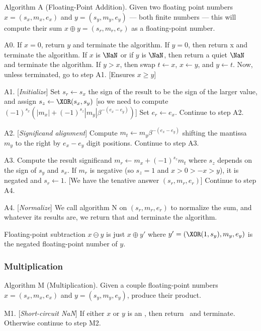 \algbegin Algorithm A (Floating-Point Addition). Given two floating
point numbers $x=(s_{x},m_{x},e_{x})$ and $y=(s_{y},m_{y},e_{y})$ ---
both finite numbers --- this
will compute their sum $x\oplus y = (s_{r}, m_{r}, e_{r})$ as a
floating-point number.

\algstep A0.
If $x = 0$, return $y$ and terminate the algorithm.
If $y=0$, then return x and terminate the algorithm.
If $x$ is $\NaN$ or if $y$ is $\NaN$, then return a quiet $\NaN$
and terminate the algorithm.
If $y > x$, then swap $t\gets x$, $x\gets y$, and $y\gets t$.
Now, unless terminated, go to step A1. [Ensures $x\geq y$]

\algstep A1. [{\it Initialize\/}]
Set $s_{r}\gets s_{x}$ the sign of the
result to be the sign of the larger value, and assign $s_{z} \gets \XOR(s_{x},s_{y})$
[so we need to compute $(-1)^{s_{x}}(|m_{x}| + (-1)^{s_{z}}|m_{y}|\beta^{-(e_{x}-e_{y})})$]
Set $e_{r}\gets e_{x}$. Continue to step A2.

\algstep A2. [{\it Significand alignment\/}] Compute $m_{t}\gets m_{y}\beta^{-(e_{x}-e_{y})}$
shifting the mantissa $m_{y}$ to the right by $e_{x}-e_{y}$ digit
positions. Continue to step A3.

\algstep A3. Compute the result significand $m_{r}\gets m_{x} + (-1)^{s_{z}}m_{t}$
where $s_{z}$ depends on the sign of $s_{y}$ and $s_{x}$. If $m_{r}$
is negative (so $s_{z}=1$ and $x>0>-x>y$), it is negated and $s_{r}\gets 1$.
[We have the tenative answer $(s_{r}, m_{r}, e_{r})$] Continue to step A4.

\algstep A4. [{\it Normalize\/}] We call algorithm N on $(s_{r}, m_{r}, e_{r})$
to normalize the sum, and whatever its results are, we return that and
terminate the algorithm.\quad\slug

\begin{rmk}[Subtraction]
  Floating-point subtraction $x\ominus y$ is just $x\oplus y'$ where
  $y' = (\XOR(1,s_{y}),m_{y},e_{y})$ is the negated floating-point
  number of $y$.
\end{rmk}

\subsubsection{Multiplication}

\algbegin Algorithm M (Multiplication). Given a couple floating-point
numbers $x=(s_{x},m_{x},e_{x})$ and $y=(s_{y}, m_{y}, e_{y})$, produce
their product.

\algstep M1. [{\it Short-circuit NaN\/}] If either $x$ or $y$ is an
\NaN, then return \qNaN\ and terminate. Otherwise continue to step M2.

